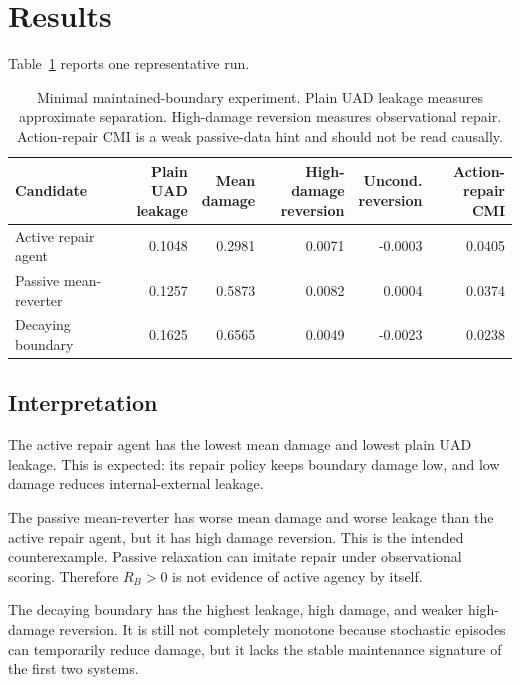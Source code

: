 \documentclass[11pt]{article}
\begin{document}
\section{Results}

Table~\ref{tab:results} reports one representative run.

\begin{table}[h]
\centering
\small
\begin{tabular}{@{}lrrrrr@{}}
\toprule
Candidate
& \shortstack{Plain UAD\\leakage}
& \shortstack{Mean\\damage}
& \shortstack{High-damage\\reversion}
& \shortstack{Uncond.\\reversion}
& \shortstack{Action-repair\\CMI} \\
\midrule
Active repair agent
& 0.1048
& 0.2981
& 0.0071
& -0.0003
& 0.0405 \\
Passive mean-reverter
& 0.1257
& 0.5873
& 0.0082
& 0.0004
& 0.0374 \\
Decaying boundary
& 0.1625
& 0.6565
& 0.0049
& -0.0023
& 0.0238 \\
\bottomrule
\end{tabular}
\caption{Minimal maintained-boundary experiment. Plain UAD leakage measures approximate separation. High-damage reversion measures observational repair. Action-repair CMI is a weak passive-data hint and should not be read causally.}
\label{tab:results}
\end{table}

\subsection{Interpretation}

The active repair agent has the lowest mean damage and lowest plain UAD leakage. This is expected: its repair policy keeps boundary damage low, and low damage reduces internal-external leakage.

The passive mean-reverter has worse mean damage and worse leakage than the active repair agent, but it has high damage reversion. This is the intended counterexample. Passive relaxation can imitate repair under observational scoring. Therefore $R_B>0$ is not evidence of active agency by itself.

The decaying boundary has the highest leakage, high damage, and weaker high-damage reversion. It is still not completely monotone because stochastic episodes can temporarily reduce damage, but it lacks the stable maintenance signature of the first two systems.
\end{document}
